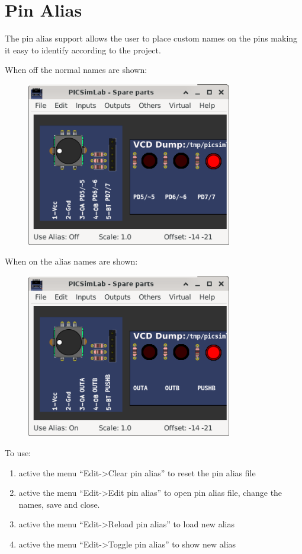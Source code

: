 \section{Pin Alias}

The pin alias support allows the user to place custom names on the pins making it easy to 
identify according to the project. 

When off the normal names are shown:
\begin{figure}[H]
\center
\includegraphics[width=0.80\textwidth]{img/pin_alias_off.png} 
\end{figure} 

When on the alias names are shown:
\begin{figure}[H]
\center
\includegraphics[width=0.80\textwidth]{img/pin_alias_on.png} 
\end{figure} 

To use:
\begin{enumerate}
 \item active the menu ``Edit->Clear pin alias'' to reset the pin alias file
 \item active the menu ``Edit->Edit pin alias'' to open pin alias file, change the names, save and close.
 \item active the menu ``Edit->Reload pin alias'' to load new alias
 \item active the menu ``Edit->Toggle pin alias'' to show new alias
\end{enumerate}


